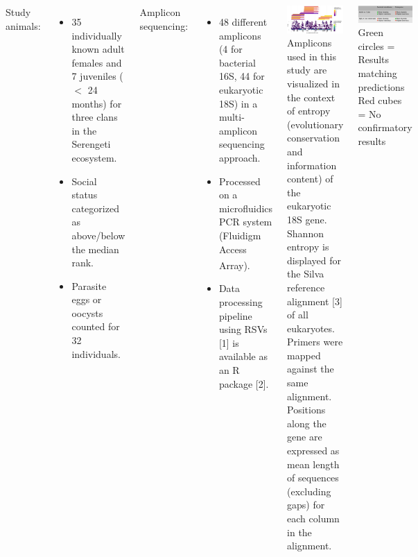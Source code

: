 \documentclass[30pt, a0paper, portrait, margin=0mm, innermargin=15mm,
               blockverticalspace=15mm, colspace=15mm, subcolspace=8mm]{tikzposter}
\begin{document}
\begin{columns}
      {
        Study animals:
        \begin{itemize}
        \item 35 individually known adult females and 7 juveniles ($<$
          24 months) for three clans in the Serengeti ecosystem.
        \item Social status categorized as above/below the median rank.
        \item Parasite eggs or oocysts counted for 32 individuals.
        \end{itemize}
        Amplicon sequencing:
        \begin{itemize}
        \item 48 different amplicons (4 for bacterial 16S, 44 for
          eukaryotic 18S) in a multi-amplicon sequencing approach.
        \item Processed on a microfluidics PCR system (Fluidigm Access
          Array\textsuperscript{\textregistered}).
        \item Data processing pipeline using RSVs [1] is available as
          an R package [2].
        \end{itemize}
        \includegraphics[width=1\linewidth]{entropy_primers_norm_woName.png}
        Amplicons used in this study are visualized in the context of
        entropy (evolutionary conservation and information content) of
        the eukaryotic 18S gene. Shannon entropy is displayed for the
        Silva reference alignment [3] of all eukaryotes. Primers were
        mapped against the same alignment. Positions along the gene
        are expressed as mean length of sequences (excluding gaps) for
        each column in the alignment.
      }

      


{
    \includegraphics[scale=0.85]{summary.png}\\
    Green circles = Results matching predictions \hspace{1cm}
    Red cubes = No confirmatory results
}


\end{columns}
\end{document}

